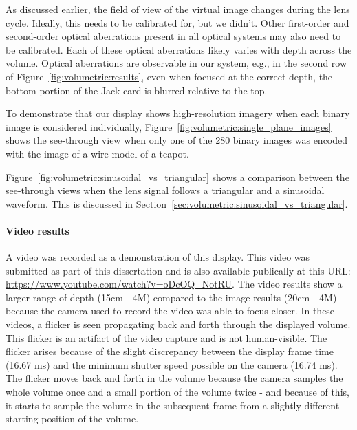 As discussed earlier, the field of view of the virtual image changes during the lens cycle. Ideally, this needs to be calibrated for, but we didn't. Other first-order and second-order optical aberrations present in all optical systems may also need to be calibrated. Each of these optical aberrations likely varies with depth across the volume. Optical aberrations are observable in our system, e.g., in the second row of Figure~\ref{fig:volumetric:results}, even when focused at the correct depth, the bottom portion of the Jack card is blurred relative to the top. 

To demonstrate that our display shows high-resolution imagery when each binary image is considered individually, Figure~\ref{fig:volumetric:single_plane_images} shows the see-through view when only one of the 280 binary images was encoded with the image of a wire model of a teapot. 


Figure~\ref{fig:volumetric:sinusoidal_vs_triangular} shows a comparison between the see-through views when the lens signal follows a triangular and a sinusoidal waveform. This is discussed in Section~\ref{sec:volumetric:sinusoidal_vs_triangular}.


\paragraph{Video results}
A video was recorded as a demonstration of this display. This video was submitted as part of this dissertation and is also available publically at this URL: \url{https://www.youtube.com/watch?v=oDcOQ_NotRU}. 
The video results show a larger range of depth (15cm - 4M) compared to the image results (20cm - 4M) because the camera used to record the video was able to focus closer. In these videos, a flicker is seen propagating back and forth through the displayed volume. This flicker is an artifact of the video capture and is not human-visible. The flicker arises because of the slight discrepancy between the display frame time (16.67 ms) and the minimum shutter speed possible on the camera (16.74 ms). The flicker moves back and forth in the volume because the camera samples the whole volume once and a small portion of the volume twice - and because of this, it starts to sample the volume in the subsequent frame from a slightly different starting position of the volume. 

